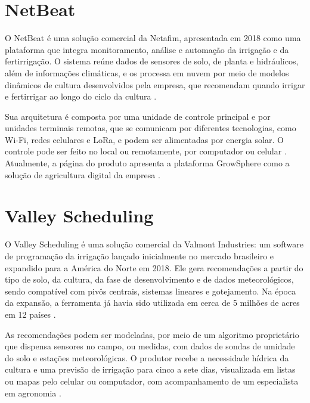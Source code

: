 \section{NetBeat}
\label{sec:netbeat}

O NetBeat é uma solução comercial da Netafim, apresentada em 2018 como uma
plataforma que integra monitoramento, análise e automação da irrigação e da
fertirrigação. O sistema reúne dados de sensores de solo, de planta e
hidráulicos, além de informações climáticas, e os processa em nuvem por meio de
modelos dinâmicos de cultura desenvolvidos pela empresa, que recomendam quando
irrigar e fertirrigar ao longo do ciclo da cultura
\cite{israelagri2018netbeat}.

Sua arquitetura é composta por uma unidade de controle principal e por unidades
terminais remotas, que se comunicam por diferentes tecnologias, como Wi-Fi,
redes celulares e LoRa, e podem ser alimentadas por energia solar. O controle
pode ser feito no local ou remotamente, por computador ou celular
\cite{e4cnetbeat}. Atualmente, a página do produto apresenta a plataforma
GrowSphere como a solução de agricultura digital da empresa
\cite{netafimgrowsphere}.

\section{Valley Scheduling}
\label{sec:valley}

O Valley Scheduling é uma solução comercial da Valmont Industries: um software
de programação da irrigação lançado inicialmente no mercado brasileiro e
expandido para a América do Norte em 2018. Ele gera recomendações a partir do
tipo de solo, da cultura, da fase de desenvolvimento e de dados meteorológicos,
sendo compatível com pivôs centrais, sistemas lineares e gotejamento. Na época
da expansão, a ferramenta já havia sido utilizada em cerca de 5 milhões de
acres em 12 países \cite{valmont2018}.

As recomendações podem ser modeladas, por meio de um algoritmo proprietário que
dispensa sensores no campo, ou medidas, com dados de sondas de umidade do solo e
estações meteorológicas. O produtor recebe a necessidade hídrica da cultura e
uma previsão de irrigação para cinco a sete dias, visualizada em listas ou mapas
pelo celular ou computador, com acompanhamento de um especialista em agronomia
\cite{valleyscheduling}.

